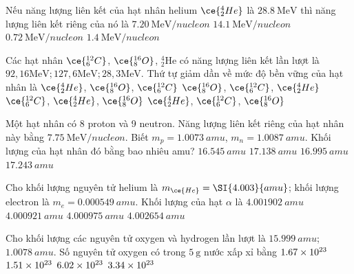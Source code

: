 \begin{ex}
	Nếu năng lượng liên kết của hạt nhân helium $\ce{_2^4He}$ là $\SI{28.8}{\mega\electronvolt}$ thì năng lượng liên kết riêng của nó là
	\choice
	{\True $\SI{7.20}{\mega\electronvolt/nucleon}$}
	{$\SI{14.1}{\mega\electronvolt/nucleon}$}
	{$\SI{0.72}{\mega\electronvolt/nucleon}$}
	{$\SI{1.4}{\mega\electronvolt/nucleon}$}
\end{ex}
\begin{ex}
	Các hạt nhân $\ce{_6^{12}C}$, $\ce{_8^{16}O}$, ${ }_2^4 \mathrm{He}$ có năng lượng liên kết lần lượt là $92,16 \mathrm{MeV} ; 127,6 \mathrm{MeV} ; 28,3 \mathrm{MeV}$. Thứ tự giảm dần về mức độ bền vững của hạt nhân là	
	\choice
	{$\ce{_2^4He}$, $\ce{_8^{16}O}$, $\ce{_6^{12}C}$}
	{\True $\ce{_8^{16}O}$, $\ce{_6^{12}C}$, $\ce{_2^4He}$}
	{$\ce{_6^{12}C}$, $\ce{_2^4He}$, $\ce{_8^{16}O}$}
	{$\ce{_2^4He}$, $\ce{_6^{12}C}$, $\ce{_8^{16}O}$}
	\loigiai{}
\end{ex}
\begin{ex}
	Một hạt nhân có 8 proton và 9 neutron. Năng lượng liên kết riêng của hạt nhân này bằng $\SI{7.75}{\mega\electronvolt/nucleon}$. Biết $m_p=\SI{1.0073}{amu}$, $ m_n=\SI{1.0087}{amu}$. Khối lượng của hạt nhân đó bằng bao nhiêu amu?
	\choice
	{$\SI{16.545}{amu}$}
	{$\SI{17.138}{amu}$}
	{\True $\SI{16.995}{amu}$}
	{$\SI{17.243}{amu}$}
\end{ex}
\begin{ex}
	Cho khối lượng nguyên tử helium là $m_{\ce{He}}=\SI{4.003}{amu}$; khối lượng electron là $m_e=\SI{0.000549}{amu}$. Khối lượng của hạt $\alpha$ là	
	\choice
	{\True $\SI{4.001902}{amu}$}
	{$\SI{4.000921}{amu}$}
	{$\SI{4.000975}{amu}$}
	{$\SI{4.002654}{amu}$}
\end{ex}
\begin{ex}
	Cho khối lượng các nguyên tử oxygen và hydrogen lần lượt là $\SI{15.999}{amu}$; $\SI{1.0078}{amu}$. Số nguyên tử oxygen có trong $\SI{5}{\gram}$ nước xấp xỉ bằng
	\choice
	{\True $\SI{1.67E23}{}$}
	{$\SI{1.51E23}{}$}
	{$\SI{6.02E23}{}$}
	{$\SI{3.34E23}{}$}
	\loigiai{}
\end{ex}
